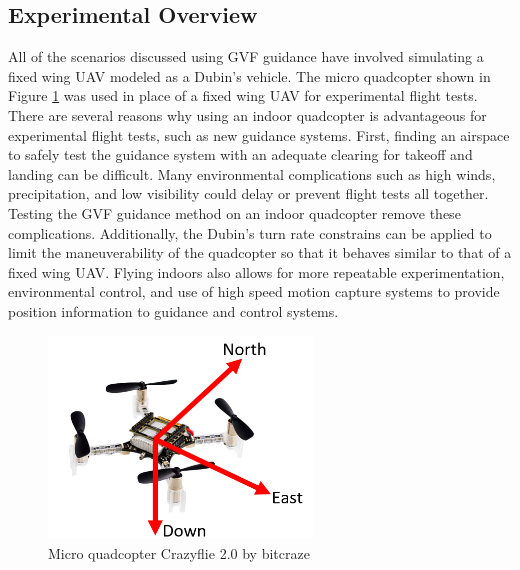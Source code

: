 \documentclass[numbered,pdftex]{ohio-etd}
\begin{document}
\subsection{Experimental Overview}
All of the scenarios discussed using GVF guidance have involved simulating a fixed wing UAV modeled as a Dubin's vehicle. The micro quadcopter shown in Figure \ref{fig:crazyflie2} was used in place of a fixed wing UAV for experimental flight tests. There are several reasons why using an indoor quadcopter is advantageous for experimental flight tests, such as new guidance systems. First, finding an airspace to safely test the guidance system with an adequate clearing for takeoff and landing can be difficult. Many environmental complications such as high winds, precipitation, and low visibility could delay or prevent flight tests all together. Testing the GVF guidance method on an indoor quadcopter remove these complications. Additionally, the Dubin's turn rate constrains can be applied to limit the maneuverability of the quadcopter so that it behaves similar to that of a fixed wing UAV. Flying indoors also allows for more repeatable experimentation, environmental control, and use of high speed motion capture systems to provide position information to guidance and control systems. 



\begin{figure}
	\centering
	\includegraphics[trim=0 0 0 0,clip,width=7cm]{PaperFigures/methods/crazyflieNED}
	\caption{Micro quadcopter Crazyflie 2.0 by bitcraze}
	\label{fig:crazyflie2}
\end{figure}
\end{document}
